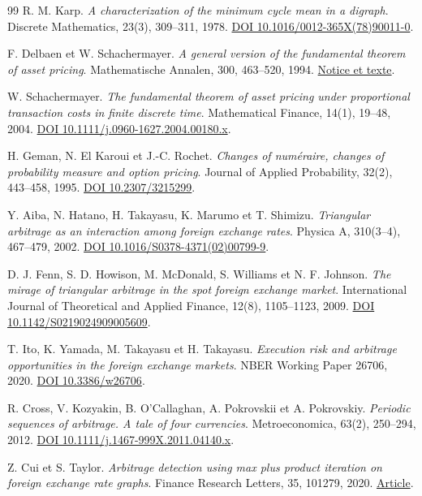 \documentclass[11pt,a4paper]{article}
\theoremstyle{clair}
\begin{document}
\begin{thebibliography}{99}
R. M. Karp. \emph{A characterization of the minimum cycle mean in a digraph}.
Discrete Mathematics, 23(3), 309--311, 1978.
\href{https://doi.org/10.1016/0012-365X(78)90011-0}{DOI 10.1016/0012-365X(78)90011-0}.

F. Delbaen et W. Schachermayer. \emph{A general version of the fundamental theorem of asset pricing}.
Mathematische Annalen, 300, 463--520, 1994.
\href{https://eudml.org/doc/165264}{Notice et texte}.

W. Schachermayer. \emph{The fundamental theorem of asset pricing under proportional transaction costs in finite discrete time}.
Mathematical Finance, 14(1), 19--48, 2004.
\href{https://doi.org/10.1111/j.0960-1627.2004.00180.x}{DOI 10.1111/j.0960-1627.2004.00180.x}.

H. Geman, N. El Karoui et J.-C. Rochet. \emph{Changes of numéraire, changes of probability measure and option pricing}.
Journal of Applied Probability, 32(2), 443--458, 1995.
\href{https://doi.org/10.2307/3215299}{DOI 10.2307/3215299}.

Y. Aiba, N. Hatano, H. Takayasu, K. Marumo et T. Shimizu.
\emph{Triangular arbitrage as an interaction among foreign exchange rates}.
Physica A, 310(3--4), 467--479, 2002.
\href{https://doi.org/10.1016/S0378-4371(02)00799-9}{DOI 10.1016/S0378-4371(02)00799-9}.

D. J. Fenn, S. D. Howison, M. McDonald, S. Williams et N. F. Johnson.
\emph{The mirage of triangular arbitrage in the spot foreign exchange market}.
International Journal of Theoretical and Applied Finance, 12(8), 1105--1123, 2009.
\href{https://doi.org/10.1142/S0219024909005609}{DOI 10.1142/S0219024909005609}.

T. Ito, K. Yamada, M. Takayasu et H. Takayasu.
\emph{Execution risk and arbitrage opportunities in the foreign exchange markets}.
NBER Working Paper 26706, 2020.
\href{https://doi.org/10.3386/w26706}{DOI 10.3386/w26706}.

R. Cross, V. Kozyakin, B. O'Callaghan, A. Pokrovskii et A. Pokrovskiy.
\emph{Periodic sequences of arbitrage. A tale of four currencies}.
Metroeconomica, 63(2), 250--294, 2012.
\href{https://doi.org/10.1111/j.1467-999X.2011.04140.x}{DOI 10.1111/j.1467-999X.2011.04140.x}.

Z. Cui et S. Taylor. \emph{Arbitrage detection using max plus product iteration on foreign exchange rate graphs}.
Finance Research Letters, 35, 101279, 2020.
\href{https://www.sciencedirect.com/science/article/pii/S1544612319304362}{Article}.


\end{thebibliography}
\end{document}
